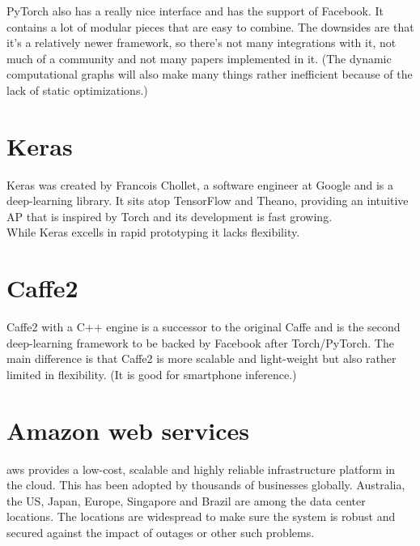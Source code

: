 \documentclass[thesis=M,english]{FITthesis}[2012/06/26]
\begin{document}
PyTorch\cite{ml_pytorch} also has a really nice interface and has the support of Facebook. It contains a lot of modular pieces that are easy to combine. The downsides are that it’s a relatively newer framework, so there’s not many integrations with it, not much of a community and not many papers implemented in it. (The dynamic computational graphs will also make many things rather inefficient because of the lack of static optimizations.)

\section{Keras}

Keras was created by Francois Chollet, a software engineer at Google and is a deep-learning library. It sits atop TensorFlow and Theano, providing an intuitive AP that is inspired by Torch and its development is fast growing.\\

While Keras\cite{ml_keras} excells in rapid prototyping it lacks flexibility.

\section{Caffe2}

Caffe2\cite{ml_caffe2} with a C++ engine is a successor to the original Caffe and is the second deep-learning framework to be backed by Facebook after Torch/PyTorch. The main difference is that Caffe2 is more scalable and light-weight but also rather limited in flexibility. (It is good for smartphone inference.)

\section{Amazon web services}

\acrshort{aws} provides a low-cost, scalable and highly reliable infrastructure platform in the cloud. This has been adopted by thousands of businesses globally. Australia, the US, Japan, Europe, Singapore and Brazil are among the data center locations. The locations are widespread to make sure the system is robust and secured against the impact of outages or other such problems.\\
\end{document}
